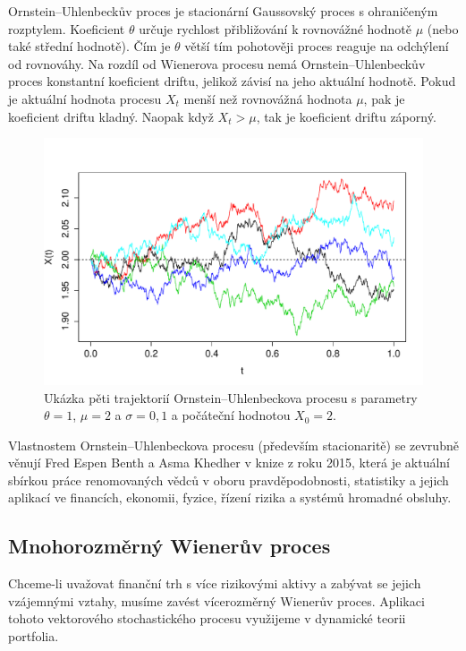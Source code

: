 \documentclass[a4paper,12pt]{report}
\theoremstyle{definition} \newtheorem{definice}[veta]{Definice}
\theoremstyle{remark}
\begin{document}
Ornstein–Uhlenbeckův proces je stacionární Gaussovský proces s ohraničeným rozptylem. 
Koeficient $\theta$ určuje rychlost přibližování k rovnovážné hodnotě $\mu$ (nebo také střední hodnotě).
Čím je $\theta$ větší tím pohotověji proces reaguje na odchýlení od rovnováhy. 
Na rozdíl od Wienerova procesu nemá Ornstein–Uhlenbeckův proces konstantní koeficient driftu, jelikož závisí na jeho aktuální hodnotě.
Pokud je aktuální hodnota procesu $X_t$ menší než rovnovážná hodnota $\mu$, pak je koeficient driftu kladný.
Naopak když $X_t>\mu$, tak je koeficient driftu záporný.

\begin{figure}[!htbp]
  \centering 
	\includegraphics[width=13.5cm, clip, trim= 0 15 25 50]{IMG/OU_v4.pdf}
  \caption{Ukázka pěti trajektorií Ornstein–Uhlenbeckova procesu s parametry $\theta=1$, $\mu=2$ a  $\sigma=0,1$ a počáteční hodnotou $X_0=2$.}  \label{OU_graf}
\end{figure}

Vlastnostem Ornstein–Uhlenbeckova procesu (především stacionaritě) se zevrubně věnují Fred Espen Benth a Asma Khedher v knize \cite{podolskij2015fascination} z roku 2015, která je aktuální sbírkou práce renomovaných vědců v oboru pravděpodobnosti, statistiky a jejich aplikací ve financích, ekonomii, fyzice, řízení rizika a systémů hromadné obsluhy.

\subsection{Mnohorozměrný Wienerův proces}
Chceme-li uvažovat finanční trh s více rizikovými aktivy a zabývat se jejich vzájemnými vztahy, musíme zavést vícerozměrný Wienerův proces.
Aplikaci tohoto vektorového stochastického procesu využijeme v dynamické teorii portfolia.
\end{document}
